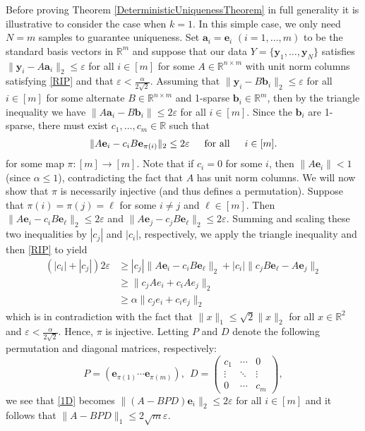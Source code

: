 \documentclass[journal, onecolumn]{IEEEtran}
\begin{document}
Before proving Theorem \ref{DeterministicUniquenessTheorem} in full generality it is illustrative to consider the case when $k=1$. In this simple case, we only need $N = m$ samples to guarantee uniqueness. Set $\mathbf{a}_i = \mathbf{e}_i$ $(i = 1, \ldots, m)$ to be the standard basis vectors in $\mathbb{R}^m$ and suppose that our data $Y = \{\mathbf{y}_1, \ldots, \mathbf{y}_N\}$ satisfies $\|\mathbf{y}_i - A\mathbf{a}_i\|_2 \leq \varepsilon$ for all $i \in [m]$ for some $A \in \mathbb{R}^{n \times m}$ with unit norm columns satisfying \eqref{RIP} and that $\varepsilon < \frac{\alpha}{2\sqrt{2}}$. Assuming that $\|\mathbf{y}_i - B\mathbf{b}_i\|_2 \leq \varepsilon$ for all $i \in [m]$ for some alternate $B \in \mathbb{R}^{n \times m}$ and 1-sparse $\mathbf{b}_i \in \mathbb{R}^m$, then by the triangle inequality we have $\|A\mathbf{a}_i - B\mathbf{b}_i\| \leq 2\varepsilon$ for all $i \in [m]$. Since the $\mathbf{b}_i$ are 1-sparse, there must exist $c_1, \ldots, c_m \in \mathbb{R}$ such that 
\begin{align}\label{1D}
\|A\mathbf{e}_i - c_iB\mathbf{e}_{\pi(i)}\|_2 \leq 2\varepsilon \indent \text{for all} \indent i \in [m].
\end{align}
for some map $\pi: [m] \to [m]$. 
Note that if $c_i = 0$ for some $i$, then $\|A\mathbf{e}_i\| < 1$ (since $\alpha \leq 1$), contradicting the fact that $A$ has unit norm columns. We will now show that $\pi$ is necessarily injective (and thus defines a permutation). Suppose that $\pi(i) = \pi(j) = \ell$ for some $i \neq j$ and $\ell \in [m]$. Then $\|A\mathbf{e}_i - c_iB\mathbf{e}_{\ell}\|_2  \leq 2\varepsilon$ and $\|A\mathbf{e}_j - c_jB\mathbf{e}_{\ell}\|_2 \leq 2\varepsilon$. Summing and scaling these two inequalities by $|c_j|$ and $|c_i|$, respectively, we apply the triangle inequality and then \eqref{RIP} to yield
\begin{align*}
(|c_i| + |c_j|) 2\varepsilon
&\geq |c_j|\|A\mathbf{e}_i - c_iB\mathbf{e}_{\ell}\|_2 + |c_i|\|c_jB\mathbf{e}_{\ell} - A\mathbf{e}_j\|_2 \\
&\geq \|c_jAe_i + c_iAe_j\|_2 \\
&\geq \alpha\|c_je_i + c_ie_j\|_2
\end{align*}
%
which is in contradiction with the fact that $\|x\|_1 \leq \sqrt{2}\|x\|_2$ for all $x \in \mathbb{R}^2$ and $\varepsilon < \frac{\alpha}{2\sqrt{2}}$. Hence, $\pi$ is injective. Letting $P$ and $D$ denote the following permutation and diagonal matrices, respectively:
\begin{equation}\label{PandD}
P = \left( \mathbf{e}_{\pi(1)} \cdots \mathbf{e}_{\pi(m)}\right), \ \ D = \left(\begin{array}{ccc}c_1 & \cdots & 0 \\\vdots & \ddots & \vdots \\0 & \cdots & c_m\end{array}\right),
\end{equation}
%
we see that \eqref{1D} becomes $\|(A - BPD)\mathbf{e}_i\|_2 \leq 2\varepsilon$ for all $i \in [m]$ and it follows that $\|A-BPD\|_1 \leq 2\sqrt{m}\varepsilon$.
\end{document}
